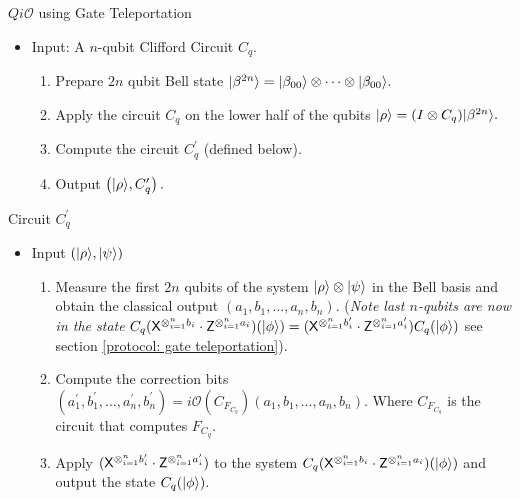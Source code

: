 \begin{algorithm}[H]
   \caption{$Qi\mathcal{O}$ using Gate Teleportation}
  \begin{itemize}
  \item Input: A $n$-qubit Clifford Circuit $C_q.$
  \begin{enumerate}
  \item Prepare $2n$ qubit Bell state ${\lvert}\beta^{ 2n}\rangle={\lvert}\beta_{00}\rangle\otimes \cdots \otimes {\lvert}\beta_{00}\rangle.$
  \item Apply the circuit $C_q$ on the lower half of the qubits ${\lvert}\rho\rangle=(I\otimes C_q) {\lvert}\beta^{2n}\rangle.$
  \item Compute the circuit $C_q^\prime$ (defined below).
  \item Output $\left({\lvert}\rho\rangle,C_q^\prime \right).$
  \end{enumerate}
  \end{itemize}
\end{algorithm}


\begin{algorithm}[H]
\caption{Circuit $C_q^\prime$}
  \begin{itemize}
  \item Input  $\left({\lvert}\rho\rangle, {\lvert}\psi\rangle \right)$
  \begin{enumerate}
  \item  Measure the first $2n$ qubits of the system ${\lvert}\rho\rangle\otimes {\lvert}\psi\rangle$ in the Bell basis and obtain the classical output $(a_1,b_1,\ldots,a_n,b_n).$ ({\em Note last $n$-qubits are now in the state} $C_q({\sf X}^{\otimes_{i=1}^{n} b_{i}} \cdot {\sf Z}^{\otimes_{i=1}^{n} a_{i}})({\lvert}\phi\rangle)=({\sf X}^{\otimes_{i=1}^{n} b_{i}^\prime} \cdot {\sf Z}^{\otimes_{i=1}^{n} a_{i}^\prime})C_q({\lvert}\phi\rangle)$ see section \ref{protocol: gate  teleportation}).
  \item Compute the correction bits $(a_1^\prime,b_1^\prime,\ldots,a_n^\prime,b_n^\prime)=i\mathcal{O}(C_{F_{C_q}})(a_1,b_1,\ldots,a_n,b_n).$ Where $C_{F_{C_q}}$ is the circuit that computes $F_{C_q}.$
  \item Apply $({\sf X}^{\otimes_{i=1}^{n} b_{i}^\prime} \cdot {\sf Z}^{\otimes_{i=1}^{n} a_{i}^\prime})$ to the system $C_q({\sf X}^{\otimes_{i=1}^{n} b_{i}} \cdot {\sf Z}^{\otimes_{i=1}^{n} a_{i}})({\lvert}\phi\rangle)$  and output the state $C_q({\lvert}\phi\rangle).$
  \end{enumerate}
  \end{itemize}
\end{algorithm}

